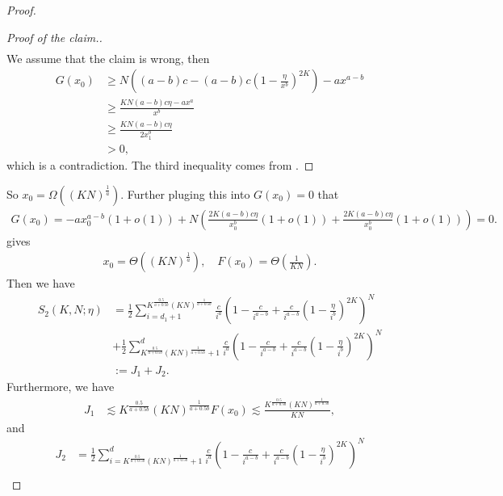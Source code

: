 \begin{proof}
\begin{proof}[Proof of the claim.]
\begin{align*}
    \end{align*}
    We assume that the claim is wrong, then
    \begin{align*}
        G(x_0)&\geq N\left((a-b)c-(a-b)c\left(1-\frac{\eta}{x^b}\right)^{2K}\right)-ax^{a-b}  \\
        &\geq \frac{KN(a-b)c\eta-ax^{a}}{x^b}  \\
        &\geq \frac{KN(a-b)c\eta}{2x_1^b}  \\
        &> 0, 
    \end{align*}
    which is a contradiction. The third inequality comes from .
\end{proof}
So $x_0 = \Omega\left((KN)^{\frac{1}{a}}\right)$.
Further pluging this into $G(x_0)=0$ that
\begin{align*}
    G(x_0) = -ax_0^{a-b}(1+o(1))+N\left(\frac{2K(a-b)c\eta}{x_0^b}(1+o(1))+\frac{2K(a-b)c\eta}{x_0^b}(1+o(1))\right) = 0.
\end{align*}
gives
\begin{align*}
    x_0 = \Theta\left((KN)^{\frac{1}{a}}\right), \quad F(x_0)=\Theta\left(\frac{1}{KN}\right).
\end{align*}
Then we have
\begin{align*}
    S_2(K, N;\eta)
    &=\frac{1}{2}\sum_{i=d_1+1}^{K^{\frac{0.5}{a+0.5b}}(KN)^{\frac{1}{a+0.5b}}}\frac{c}{i^{a}}\left(1-\frac{c}{i^{a-b}}+\frac{c}{i^{a-b}}\left(1-\frac{\eta}{i^b}\right)^{2K}\right)^N \\
    &+\frac{1}{2}\sum_{K^{\frac{0.5}{a+0.5b}}(KN)^{\frac{1}{a+0.5b}}+1}^{d}\frac{c}{i^{a}}\left(1-\frac{c}{i^{a-b}}+\frac{c}{i^{a-b}}\left(1-\frac{\eta}{i^b}\right)^{2K}\right)^N \\
    &:=J_1+J_2.
\end{align*}
Furthermore, we have
\begin{align*}
    J_1&\lesssim K^{\frac{0.5}{a+0.5b}}(KN)^{\frac{1}{a+0.5b}}F(x_0)\lesssim \frac{K^{\frac{0.5}{a+0.5b}}(KN)^{\frac{1}{a+0.5b}}}{KN} ,
\end{align*}
and
\begin{align*}
    J_2&=\frac{1}{2}\sum_{i=K^{\frac{0.5}{a+0.5b}}(KN)^{\frac{1}{a+0.5b}}+1}^{d}\frac{c}{i^{a}}\left(1-\frac{c}{i^{a-b}}+\frac{c}{i^{a-b}}\left(1-\frac{\eta}{i^b}\right)^{2K}\right)^N \\

\end{align*}
\end{proof}
